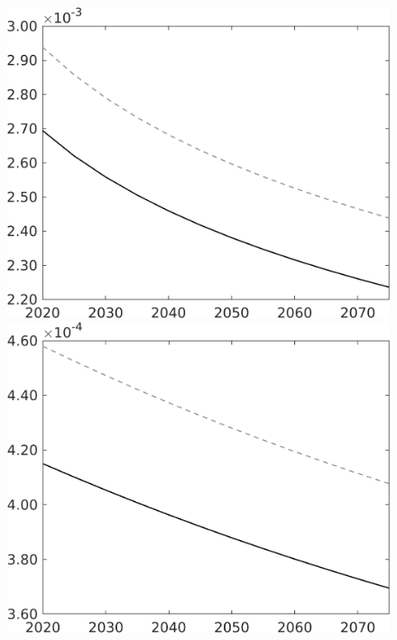 \documentclass[12pt]{article}
\begin{document}
\begin{figure}[h!!]
\begin{minipage}[]{0.32\textwidth}
	\end{minipage}	
	\begin{minipage}[]{0.32\textwidth}
		\includegraphics[width=1\textwidth]{../../codding_model/own_basedOnFried/optimalPol_010922_revision/figures/all_13Sept22/CompTaul_LFBAU_Reg0_Lf_spillover0_nsk0_xgr1_knspil0_sep1_countec0_GovRev0_etaa0.79_lgd0.png}
	\end{minipage}	
	\begin{minipage}[]{0.32\textwidth}
		\includegraphics[width=1\textwidth]{../../codding_model/own_basedOnFried/optimalPol_010922_revision/figures/all_13Sept22/CompTaul_LFBAU_Reg0_Lg_spillover0_nsk0_xgr1_knspil0_sep1_countec0_GovRev0_etaa0.79_lgd0.png}

\end{minipage}
\end{figure}
\end{document}
